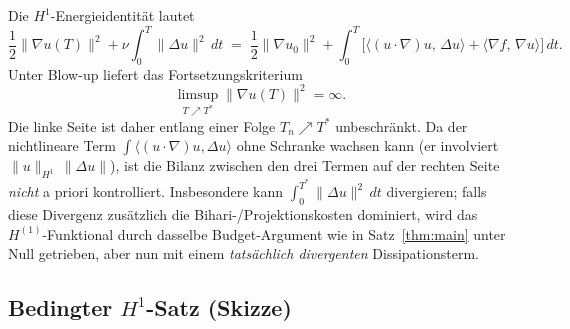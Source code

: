 \documentclass[12pt,a4paper]{article}
\theoremstyle{definition}
\theoremstyle{plain}
\theoremstyle{remark}
\begin{document}
Die $H^1$-Energieidentität lautet
\begin{equation}\label{eq:H1-energy-id}
  \frac{1}{2}\|\nabla u(T)\|^2 + \nu\int_0^T\|\Delta u\|^2\,dt
  \;=\;
  \frac{1}{2}\|\nabla u_0\|^2
  + \int_0^T\!\bigl[\langle (u\cdot\nabla)u,\,\Delta u\rangle
  + \langle \nabla f,\, \nabla u\rangle\bigr]\,dt.
\end{equation}
Unter Blow-up liefert das Fortsetzungskriterium
\[
  \limsup_{T\nearrow T^*}\|\nabla u(T)\|^2=\infty.
\]
Die linke Seite ist daher entlang einer Folge $T_n\nearrow T^*$ unbeschränkt.
Da der nichtlineare Term
$\int\langle (u\cdot\nabla)u, \Delta u\rangle$ ohne Schranke wachsen kann
(er involviert $\|u\|_{H^1}\,\|\Delta u\|$), ist die Bilanz
zwischen den drei Termen auf der rechten Seite \emph{nicht} a priori
kontrolliert. Insbesondere kann $\int_0^{T^*}\|\Delta u\|^2\,dt$
divergieren; falls diese Divergenz zusätzlich die Bihari-/Projektionskosten
dominiert, wird das $H^{(1)}$-Funktional durch dasselbe Budget-Argument wie in
Satz~\ref{thm:main} unter Null getrieben, aber nun mit einem
\emph{tatsächlich divergenten} Dissipationsterm.

\subsection{Bedingter \texorpdfstring{$H^1$}{H1}-Satz (Skizze)}
\end{document}
